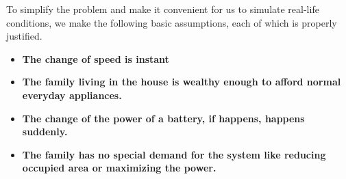 \documentclass[12pt]{article}
\begin{document}
To simplify the problem and make it convenient for us to simulate real-life conditions, we make the following basic assumptions, each of which is properly justified.

\begin{itemize}
    \item {\bf The change of speed is instant}
    \item {\bf The family living in the house is wealthy enough to afford normal everyday appliances.}

    \item {\bf The change of the power of a battery, if happens,  happens suddenly.}

    \item {\bf The family has no special demand for the system like reducing occupied area or maximizing the power.}

\end{itemize}
\end{document}
